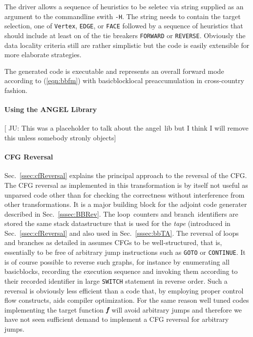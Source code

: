 \documentclass[11pt]{article}
\newcommand{\angel}{angel}
\newcommand{\Loop}{loop}
\newcommand{\branch}{branch}
\newcommand{\basicblock}{basicblock}
\newcommand{\bmf}{\mbox{\bf\em f}}
\newcommand{\code}[1]{{\small\tt{#1}}}
\newcommand{\refsec}[1]{{Sec.~\ref{#1}}}
\newcommand{\refeqn}[1]{{(\ref{#1})}}
\begin{document}
The driver allows a sequence of heuristics to be seletec via string supplied as 
an argument to the commandline swith \code{-H}. The string needs to contain 
the target selection, one of \code{Vertex}, \code{EDGE}, or \code{FACE} followed by 
a sequence of heuristics that should include at least on of the tie breakers \code{FORWARD} or 
\code{REVERSE}. 
Obviously the data locality criteria still are rather simplistic but 
the code is easily extensible for more elaborate strategies. 

The generated code is executable and represents an overall forward mode 
according to \refeqn{eqn:bbfm} with \basicblock\-local preaccumulation in 
cross-country fashion. 

\paragraph{Using the ANGEL Library}\label{sssec:angel}
{\color{red} [ JU: This was a placeholder to talk about the \angel\ lib 
  but I think I will remove this unless somebody stronly objects]}
\paragraph{CFG Reversal}\label{sssec:cfgRevAlg}

\refsec{ssec:cfReversal} explains the principal approach to the reversal 
of the CFG. The CFG reversal as implemented in this transformation is 
by itself not useful as unparsed code other than for checking the correctness without 
interference from other transformations. It is a major building block for 
the  
adjoint code generater described in \refsec{sssec:BBRev}. 
The \Loop\ counters and \branch\ identifiers are stored the same 
stack datastructure that is used for the {\em tape} (introduced in 
\refsec{ssec:cfReversal} and also used in \refsec{sssec:bbTA}.  
The reversal of loops and branches as detailed in \cite{NULF04CFR} assumes 
CFGs to be well-structured, that is, essentially to be free of arbitrary jump instructions 
such as \code{GOTO} or \code{CONTINUE}. 
It is of course possible to reverse such graphs, for instance by enumerating
all {\basicblock}s, recording the execution sequence and invoking them according 
to their recorded identifier in  large  \code {SWITCH} statement in reverse order.
Such a reversal is obviously less efficient than a code that, by employing proper 
control flow constructs, aids compiler optimization. 
For the same reason well tuned codes implementing the target function $\bmf$ will 
avoid arbitrary jumps and therefore we have not seen sufficient demand to implement 
a CFG reversal for arbitrary jumps. 
\end{document}
